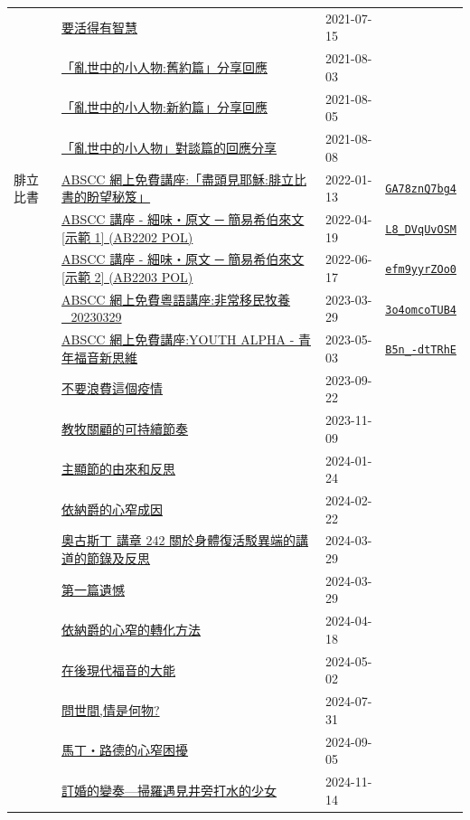 \documentclass{book}
\begin{document}
{\begin{xltabular}{\textwidth}{|p{0.15\textwidth} p{0.6\textwidth}|p{0.07\textwidth} p{0.1\textwidth}|}
  & \hyperref[sec:2]{要活得有智慧} & 2021-07-15 &  \\
  & \hyperref[sec:3]{「亂世中的小人物:舊約篇」分享回應} & 2021-08-03 &  \\
  & \hyperref[sec:4]{「亂世中的小人物:新約篇」分享回應} & 2021-08-05 &  \\
  & \hyperref[sec:5]{「亂世中的小人物」對談篇的回應分享} & 2021-08-08 &  \\
腓立比書  & \hyperref[sec:GA78znQ7bg4]{ABSCC 網上免費講座:「盡頭見耶穌:腓立比書的盼望秘笈」} & 2022-01-13 & \href{https://youtube.com/watch?v=GA78znQ7bg4}{\texttt{GA78znQ7bg4}} \\
  & \hyperref[sec:L8_DVqUvOSM]{ABSCC 講座 - 細味‧原文 ─ 簡易希伯來文 [示範 1] (AB2202 POL)} & 2022-04-19 & \href{https://youtube.com/watch?v=L8_DVqUvOSM}{\texttt{L8\_DVqUvOSM}} \\
  & \hyperref[sec:efm9yyrZOo0]{ABSCC 講座 - 細味‧原文 ─ 簡易希伯來文 [示範 2] (AB2203 POL)} & 2022-06-17 & \href{https://youtube.com/watch?v=efm9yyrZOo0}{\texttt{efm9yyrZOo0}} \\
  & \hyperref[sec:3o4omcoTUB4]{ABSCC 網上免費粵語講座:非常移民牧養\_20230329} & 2023-03-29 & \href{https://youtube.com/watch?v=3o4omcoTUB4}{\texttt{3o4omcoTUB4}} \\
  & \hyperref[sec:B5n__dtTRhE]{ABSCC 網上免費講座:YOUTH ALPHA - 青年福音新思維} & 2023-05-03 & \href{https://youtube.com/watch?v=B5n_-dtTRhE}{\texttt{B5n\_-dtTRhE}} \\
  & \hyperref[sec:6]{不要浪費這個疫情} & 2023-09-22 &  \\
  & \hyperref[sec:7]{教牧關顧的可持續節奏} & 2023-11-09 &  \\
  & \hyperref[sec:8]{主顯節的由來和反思} & 2024-01-24 &  \\
  & \hyperref[sec:9]{依納爵的心窄成因} & 2024-02-22 &  \\
  & \hyperref[sec:10]{奧古斯丁 講章 242 關於身體復活駁異端的講道的節錄及反思} & 2024-03-29 &  \\
  & \hyperref[sec:11]{第一篇遺憾} & 2024-03-29 &  \\
  & \hyperref[sec:12]{依納爵的心窄的轉化方法} & 2024-04-18 &  \\
  & \hyperref[sec:13]{在後現代福音的大能} & 2024-05-02 &  \\
  & \hyperref[sec:14]{問世間,情是何物?} & 2024-07-31 &  \\
  & \hyperref[sec:15]{馬丁‧路德的心窄困擾} & 2024-09-05 &  \\
  & \hyperref[sec:16]{訂婚的變奏—掃羅遇見井旁打水的少女} & 2024-11-14 &  \\
\end{xltabular}
}
\newpage
\end{document}
